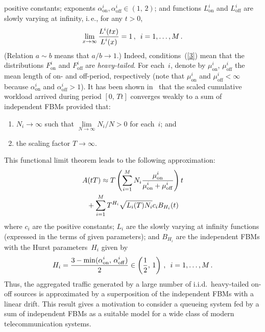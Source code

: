 \begin{multicols}{2}
positive constants; exponents
$\alpha_{\mathrm{on}}^i,\alpha_{\mathrm{off}}^i\in (1,\,2)$;
and functions $L_{\mathrm{on}}^i$ and
$L_{\mathrm{off}}^i$ are slowly varying at infinity, i.\,e., for any $t >0$,
$$
\lim\limits_{x \to \infty} \displaystyle\frac{\displaystyle L^i(tx)\mathstrut}{\displaystyle L^i(x)\mathstrut}=1\,,\enskip i=1,\ldots,M\,.
$$
(Relation  $a\sim b$ means that $a/b\to 1$.) Indeed, conditions~(\ref{3})
mean that the distributions $F_{\mathrm{on}}^i$ and  $F_{\mathrm{off}}^i$
are {\it heavy-tailed}. For each~$i$, denote by $\mu_{\mathrm{on}}^i$,
$\mu_{\mathrm{off}}^i$ the mean length of  on-  and off-period, respectively
(note that $\mu_{\mathrm{on}}^i$ and $\mu_{\mathrm{off}}^i<\infty$ because
$\alpha_{\mathrm{on}}^i$ and $\alpha_{\mathrm{off}}^i>1$).
It has been  shown in~\cite{Taqqu}  that the scaled cumulative workload arrived during
period $[0,\,Tt]$ converges weakly to a sum of independent
FBMs provided that:
\begin{enumerate}[($i$)]
\item $N_i\to \infty$ such that
 $\lim\limits_{N\to \infty}N_i/N>0$ for each~$i$;
 and
 \item the scaling factor $T\to \infty$.
 \end{enumerate}
 This functional limit theorem leads to the following approximation:
\begin{multline*}
A(tT)\approx T\left( \sum\limits_{i=1}^M N_i
\displaystyle\frac{\displaystyle \mu_{\mathrm{on}}^i\mathstrut}{\displaystyle \mu_{\mathrm{on}}^i+\mu_{\mathrm{off}}^i\mathstrut} \right)t\\
{} + \sum\limits_{i=1}^M
T^{H_i} \sqrt{L_i(T)N_i}c_i B_{H_i}(t)
\end{multline*}
where $c_i$ are the positive constants; $L_i$ are the slowly varying at
infinity functions (expressed in the terms of given  parameters); and
$B_{H_i}$ are the independent FBMs with the Hurst parameters~$H_i$
 given by
$$
H_i=\displaystyle\frac{\displaystyle 3-\min(\alpha_{\mathrm{on}}^i,\,\alpha_{\mathrm{off}}^i)\mathstrut}{\displaystyle 2\mathstrut}\in
\left(\displaystyle\frac{\displaystyle 1\mathstrut}{\displaystyle 2\mathstrut},\,1 \right)\,,\enskip i=1,\ldots, M\,.
$$
Thus, the aggregated traffic generated by a large number of
i.i.d.\ heavy-tailed on-off sources is approximated by a
superposition of  the independent FBMs with a linear drift. This
result gives a motivation to consider  a  queueing system  fed by a
sum of independent FBMs as  a suitable model for a wide class of
modern telecommunication systems.


\end{multicols}
